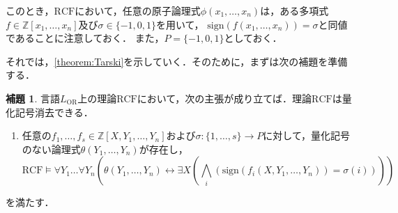 \documentclass[uplatex, dvipdfmx]{jsarticle}
\newcommand{\Z}{\mathbb{Z}}
\newcommand{\RCF}{\mathrm{RCF}}
\newcommand{\sign}{\mathrm{sign}}
\newcommand{\map}[3]{{#1}:{#2}\rightarrow{#3}}
\theoremstyle{definition}
\newtheorem{lemma}{補題}[section]
\begin{document}
このとき，$\RCF$において，任意の原子論理式$\phi(x_1, \dots, x_n)$は，ある多項式$f \in \Z[x_1, \dots, x_n]$及び$\sigma \in \{-1, 0, 1\}$を用いて，
$\sign(f(x_1, \dots, x_n)) = \sigma$と同値であることに注意しておく．
また，$P = \{-1, 0, 1\}$としておく．

それでは，\cref{theorem:Tarski}を示していく．そのために，まずは次の補題を準備する．

\begin{lemma}\label{lemma:qe_simplify}
     言語$L_\mathrm{OR}$上の理論$\RCF$において，次の主張が成り立てば．理論$\RCF$は量化記号消去できる．

     \begin{enumerate}
          \item \label{qe_1}
          任意の$f_1, \dots, f_s \in \Z[X, Y_1, \dots, Y_n]$および$\map{\sigma}{\{1,\dots, s\}}{P}$に対して，量化記号のない論理式$\theta(Y_1, \dots, Y_n)$が存在し，
          \[
               \RCF \models \forall Y_1 \dots \forall Y_n ( \theta(Y_1, \dots, Y_n) \leftrightarrow \exists X(\bigwedge_i (\sign(f_i(X,Y_1, \dots, Y_n))= \sigma(i))) )
          \]
     \end{enumerate}
     を満たす．
\end{lemma}
\end{document}
